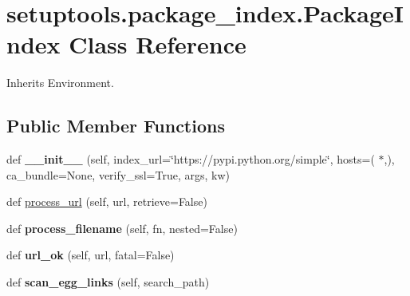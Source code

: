 \hypertarget{classsetuptools_1_1package__index_1_1_package_index}{}\section{setuptools.\+package\+\_\+index.\+Package\+Index Class Reference}
\label{classsetuptools_1_1package__index_1_1_package_index}


Inherits Environment.

\subsection*{Public Member Functions}
\begin{DoxyCompactItemize}
\item 
\mbox{\label{classsetuptools_1_1package__index_1_1_package_index_ab2d4385792e7abda100f297787ca27a0}} 
def {\bfseries \+\_\+\+\_\+init\+\_\+\+\_\+} (self, index\+\_\+url=\char`\"{}https\+://pypi.\+python.\+org/simple\char`\"{}, hosts=(\textquotesingle{} $\ast$\textquotesingle{},), ca\+\_\+bundle=None, verify\+\_\+ssl=True, args, kw)
\item 
def \hyperlink{classsetuptools_1_1package__index_1_1_package_index_a537fc87df159c2474b7fa0ccac56513d}{process\+\_\+url} (self, url, retrieve=False)
\item 
\mbox{\label{classsetuptools_1_1package__index_1_1_package_index_ac83aebaf268b16debbfb5fd6200c53f7}} 
def {\bfseries process\+\_\+filename} (self, fn, nested=False)
\item 
\mbox{\label{classsetuptools_1_1package__index_1_1_package_index_a6d4244e6fcdf1ba83a958d28fb631756}} 
def {\bfseries url\+\_\+ok} (self, url, fatal=False)
\item 
\mbox{\label{classsetuptools_1_1package__index_1_1_package_index_a50e6e468950479ac9902c899435c0483}} 
def {\bfseries scan\+\_\+egg\+\_\+links} (self, search\+\_\+path)
\item 
\mbox{\label{classsetuptools_1_1package__index_1_1_package_index_ae65aee19ddf23d6602bcd09fd3f060a7}} 

\end{DoxyCompactItemize}
